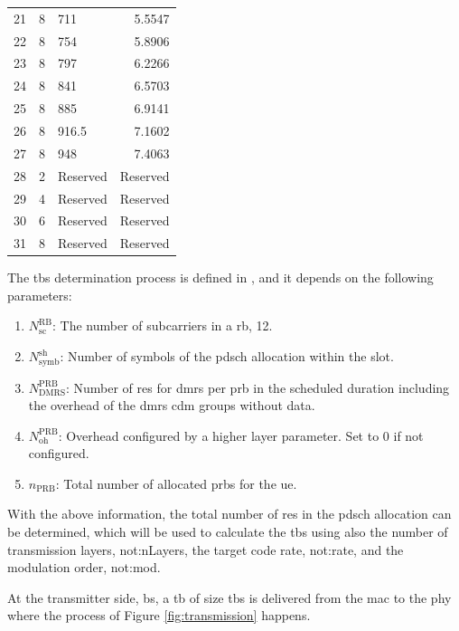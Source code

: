 \begin{table}[htb]
\begin{tabularx}{0.95\columnwidth}{l X X r}
  21 &  8   & 711       &  5.5547 \\
  22 &  8   & 754       &  5.8906 \\
  23 &  8   & 797       &  6.2266 \\
  24 &  8   & 841       &  6.5703 \\
  25 &  8   & 885       &  6.9141 \\
  26 &  8   & 916.5     &  7.1602 \\
  27 &  8   & 948       &  7.4063 \\
  28 &  2   & Reserved  & Reserved \\
  29 &  4   & Reserved  & Reserved \\
  30 &  6   & Reserved  & Reserved \\
  31 &  8   & Reserved  & Reserved \\
  \bottomrule
\end{tabularx}
\end{table}

The \gls{tbs} determination process is defined in \cite[Section 5.1.3.2]{3gpp.38.214}, and it depends on the following parameters:

\begin{enumerate}
    \item $N_{\text{sc}}^{\text{RB}}$: The number of subcarriers in a \gls{rb}, 12.
    \item $N_{\text{symb}}^{\text{sh}}$: Number of symbols of the \gls{pdsch} allocation within the slot.
    \item $N_{\text{DMRS}}^{\text{PRB}}$: Number of \glspl{re} for \gls{dmrs} per \gls{prb} in the scheduled duration including the overhead of the \gls{dmrs} \gls{cdm} groups without data.
    \item $N_{\text{oh}}^{\text{PRB}}$: Overhead configured by a higher layer parameter. Set to 0 if not configured.
    \item $n_{\text{PRB}}$: Total number of allocated \glspl{prb} for the \gls{ue}.
\end{enumerate}

With the above information, the total number of \glspl{re} in the \gls{pdsch} allocation can be determined, which will be used to calculate the \gls{tbs} using also the number of transmission layers, \gls{not:nLayers}, the target code rate, \gls{not:rate}, and the modulation order, \gls{not:mod}.

At the transmitter side, \gls{bs}, a \gls{tb} of size \gls{tbs} is delivered from the \gls{mac} to the \gls{phy} where the process of Figure \ref{fig:transmission} happens.

